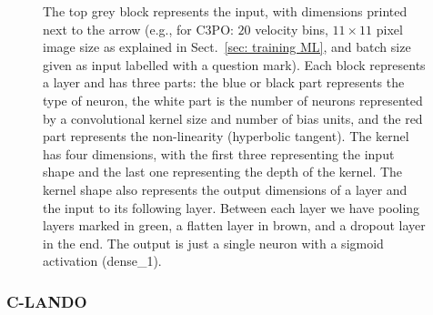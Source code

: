 \documentclass[referee]{aa} %
\begin{document}
\begin{figure}[!t]
{    The top grey block represents the input, with dimensions printed next to the arrow (e.g., for C3PO: $20$ velocity bins, $11\times11$ pixel image size as explained in Sect.~\ref{sec: training ML}, and batch size given as input labelled with a question mark).
    Each block represents a layer and has three parts: the blue or black part represents the type of neuron, the white part is the number of neurons represented by a convolutional kernel size and number of bias units, and the red part represents the non-linearity (hyperbolic tangent).
    The kernel has four dimensions, with the first three representing the input shape and the last one representing the depth of the kernel.
    The kernel shape also represents the output dimensions of a layer and the input to its following layer. %
    Between each layer we have pooling layers marked in green, a flatten layer in brown, and a dropout layer in the end. 
    The output is just a single neuron with a sigmoid activation (dense\_1).}
    \label{fig:c3po schematic}
\end{figure}

\subsubsection{C-LANDO}
\end{document}
